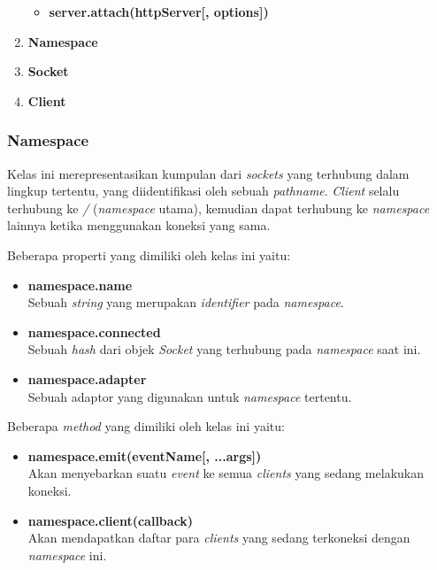 \begin{enumerate}
\begin{itemize}
			\item \textbf{server.attach(httpServer[, options])}
			
		
		
			
		\end{itemize}

	\item \textbf{Namespace}
	
	\item \textbf{Socket}
	
	\item \textbf{Client}  
	
\end{enumerate}
	
\subsubsection{Namespace}
Kelas ini merepresentasikan kumpulan dari \textit{sockets} yang terhubung dalam lingkup tertentu, yang diidentifikasi oleh sebuah \textit{pathname}. \textit{Client} selalu terhubung ke \textit{/} (\textit{namespace} utama), kemudian dapat terhubung ke \textit{namespace} lainnya ketika menggunakan koneksi yang sama.

Beberapa properti yang dimiliki oleh kelas ini yaitu: 
\begin{itemize}
	\item \textbf{namespace.name} \\ Sebuah \textit{string} yang merupakan \textit{identifier} pada \textit{namespace}.
	\item \textbf{namespace.connected} \\ Sebuah \textit{hash} dari objek \textit{Socket} yang terhubung pada \textit{namespace} saat ini.
	\item \textbf{namespace.adapter} \\ Sebuah adaptor yang digunakan untuk \textit{namespace} tertentu.
\end{itemize}

Beberapa \textit{method} yang dimiliki oleh kelas ini yaitu:

\begin{itemize}
	\item \textbf{namespace.emit(eventName[, ...args])} \\ Akan menyebarkan suatu \textit{event} ke semua \textit{clients} yang sedang melakukan koneksi.
	
	\item \textbf{namespace.client(callback)} \\ Akan mendapatkan daftar para \textit{clients} yang sedang terkoneksi dengan \textit{namespace} ini.
\end{itemize}

